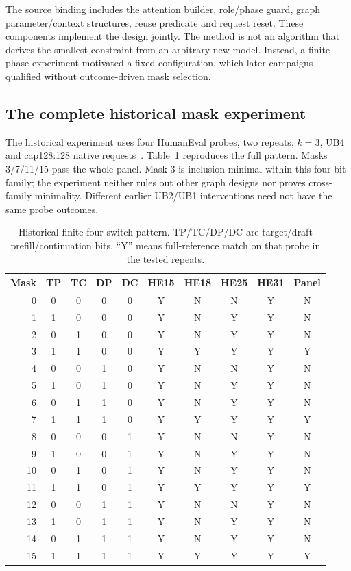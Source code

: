 The source binding includes the attention builder, role/phase guard, graph parameter/context structures, reuse predicate and request reset. These components implement the design jointly. The method is not an algorithm that derives the smallest constraint from an arbitrary new model. Instead, a finite phase experiment motivated a fixed configuration, which later campaigns qualified without outcome-driven mask selection.

\subsection{The complete historical mask experiment}
The historical experiment uses four HumanEval probes, two repeats, $k=3$, UB4 and cap128:128 native requests~\cite{history}. Table~\ref{tab:masks} reproduces the full pattern. Masks 3/7/11/15 pass the whole panel. Mask 3 is inclusion-minimal within this four-bit family; the experiment neither rules out other graph designs nor proves cross-family minimality. Different earlier UB2/UB1 interventions need not have the same probe outcomes.

\begin{table}[t]\centering\small
\caption{Historical finite four-switch pattern. TP/TC/DP/DC are target/draft prefill/continuation bits. ``Y'' means full-reference match on that probe in the tested repeats.}
\label{tab:masks}
\begin{tabular}{@{}rccccccccc@{}}\toprule
Mask&TP&TC&DP&DC&HE15&HE18&HE25&HE31&Panel\\\midrule
0&0&0&0&0&Y&N&N&Y&N\\
1&1&0&0&0&Y&N&Y&Y&N\\
2&0&1&0&0&Y&N&Y&Y&N\\
3&1&1&0&0&Y&Y&Y&Y&Y\\
4&0&0&1&0&Y&N&N&Y&N\\
5&1&0&1&0&Y&N&Y&Y&N\\
6&0&1&1&0&Y&N&Y&Y&N\\
7&1&1&1&0&Y&Y&Y&Y&Y\\
8&0&0&0&1&Y&N&N&Y&N\\
9&1&0&0&1&Y&N&Y&Y&N\\
10&0&1&0&1&Y&N&Y&Y&N\\
11&1&1&0&1&Y&Y&Y&Y&Y\\
12&0&0&1&1&Y&N&N&Y&N\\
13&1&0&1&1&Y&N&Y&Y&N\\
14&0&1&1&1&Y&N&Y&Y&N\\
15&1&1&1&1&Y&Y&Y&Y&Y\\\bottomrule
\end{tabular}
\end{table}

